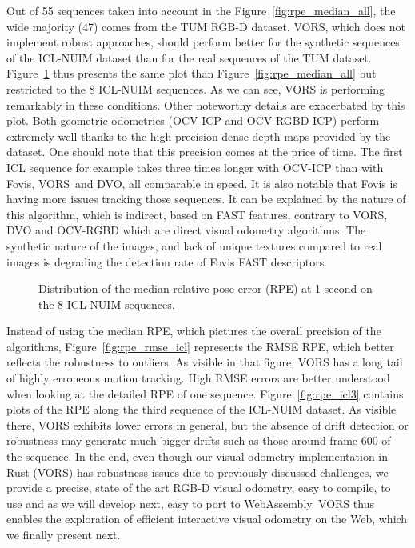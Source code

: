 Out of 55 sequences taken into account in the Figure~\ref{fig:rpe_median_all},
the wide majority (47) comes from the TUM RGB-D dataset.
VORS, which does not implement robust approaches,
should perform better for the synthetic sequences of the ICL-NUIM dataset than
for the real sequences of the TUM dataset.
Figure~\ref{fig:rpe_median_icl} thus presents the same plot than
Figure~\ref{fig:rpe_median_all} but restricted to the 8 ICL-NUIM sequences.
As we can see, VORS is performing remarkably in these conditions.
Other noteworthy details are exacerbated by this plot.
Both geometric odometries (OCV-ICP and OCV-RGBD-ICP) perform extremely well
thanks to the high precision dense depth maps provided by the dataset.
One should note that this precision comes at the price of time.
The first ICL sequence for example takes three times longer
with OCV-ICP than with Fovis, VORS and DVO, all comparable in speed.
It is also notable that Fovis is having more issues tracking those sequences.
It can be explained by the nature of this algorithm, which is indirect,
based on FAST features, contrary to VORS, DVO and OCV-RGBD which are
direct visual odometry algorithms.
The synthetic nature of the images, and lack of unique textures compared
to real images is degrading the detection rate of Fovis FAST descriptors.

\begin{figure}[ht]
	\centering
	
	\caption{Distribution of the median relative pose error (RPE) at 1 second
	on the 8 ICL-NUIM sequences.}%
	\label{fig:rpe_median_icl}
\end{figure}

Instead of using the median RPE,
which pictures the overall precision of the algorithms,
Figure~\ref{fig:rpe_rmse_icl} represents the RMSE RPE,
which better reflects the robustness to outliers.
As visible in that figure, VORS has a long tail of highly
erroneous motion tracking.
High RMSE errors are better understood when looking at the
detailed RPE of one sequence.
Figure~\ref{fig:rpe_icl3} contains plots of the RPE along the third sequence
of the ICL-NUIM dataset.
As visible there, VORS exhibits lower errors in general,
but the absence of drift detection or robustness may generate much bigger drifts
such as those around frame 600 of the sequence.
In the end, even though our visual odometry implementation in Rust (VORS)
has robustness issues due to previously discussed challenges,
we provide a precise, state of the art RGB-D visual odometry,
easy to compile, to use and as we will develop next,
easy to port to WebAssembly.
VORS thus enables the exploration of efficient interactive
visual odometry on the Web, which we finally present next.

